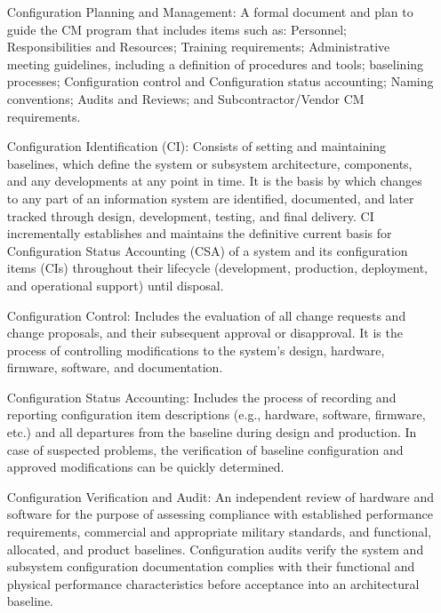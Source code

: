 \documentclass{article}
\begin{document}
    \begin{itemize}
    \item [Configuration Planning and Management:] A formal document and plan to guide the CM program that includes items such as:
    Personnel; Responsibilities and Resources; Training requirements; Administrative meeting guidelines, including a definition of procedures and tools;
    baselining processes; Configuration control and Configuration status accounting; Naming conventions; Audits and Reviews; and Subcontractor/Vendor CM requirements.
    \item [Configuration Identification (CI):] Consists of setting and maintaining baselines, which define the system or subsystem architecture,
    components, and any developments at any point in time. It is the basis by which changes to any part of an information system are identified, documented,
    and later tracked through design, development, testing, and final delivery. CI incrementally establishes and maintains the definitive current basis for Configuration Status Accounting (CSA)
    of a system and its configuration items (CIs) throughout their lifecycle (development, production, deployment, and operational support) until disposal.
    \item[Configuration Control:] Includes the evaluation of all change requests and change proposals, and their subsequent approval or disapproval.
    It is the process of controlling modifications to the system's design, hardware, firmware, software, and documentation.
    \item[ Configuration Status Accounting:] Includes the process of recording and reporting configuration item descriptions (e.g., hardware, software, firmware, etc.) and all departures
    from the baseline during design and production. In case of suspected problems, the verification of baseline configuration and approved modifications can be quickly determined.
    \item[Configuration Verification and Audit:] An independent review of hardware and software for the purpose of assessing compliance with established performance requirements,
    commercial and appropriate military standards, and functional, allocated, and product baselines. Configuration audits verify the system and subsystem configuration documentation
    complies with their functional and physical performance characteristics before acceptance into an architectural baseline.
    \end{itemize}
    
    
\end{document}
